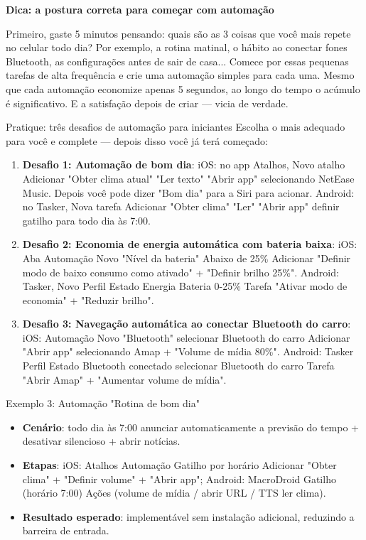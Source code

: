 \textbf{Dica: a postura correta para começar com automação}\par

Primeiro, gaste 5 minutos pensando: quais são as 3 coisas que você mais repete no celular todo dia? Por exemplo, a rotina matinal, o hábito ao conectar fones Bluetooth, as configurações antes de sair de casa... Comece por essas pequenas tarefas de alta frequência e crie uma automação simples para cada uma. Mesmo que cada automação economize apenas 5 segundos, ao longo do tempo o acúmulo é significativo. E a satisfação depois de criar — vicia de verdade.

\begin{tcbpractice}{Pratique: três desafios de automação para iniciantes}
Escolha o mais adequado para você e complete — depois disso você já terá começado:

\begin{enumerate}
  \item \textbf{Desafio 1: Automação de bom dia}: iOS: no app Atalhos, Novo atalho Adicionar "Obter clima atual" "Ler texto" "Abrir app" selecionando NetEase Music. Depois você pode dizer "Bom dia" para a Siri para acionar. Android: no Tasker, Nova tarefa Adicionar "Obter clima" "Ler" "Abrir app" definir gatilho para todo dia às 7:00.
  \item \textbf{Desafio 2: Economia de energia automática com bateria baixa}: iOS: Aba Automação Novo "Nível da bateria" Abaixo de 25\% Adicionar "Definir modo de baixo consumo como ativado" + "Definir brilho 25\%". Android: Tasker, Novo Perfil Estado Energia Bateria 0-25\% Tarefa "Ativar modo de economia" + "Reduzir brilho".
  \item \textbf{Desafio 3: Navegação automática ao conectar Bluetooth do carro}: iOS: Automação Novo "Bluetooth" selecionar Bluetooth do carro Adicionar "Abrir app" selecionando Amap + "Volume de mídia 80\%". Android: Tasker Perfil Estado Bluetooth conectado selecionar Bluetooth do carro Tarefa "Abrir Amap" + "Aumentar volume de mídia".
\end{enumerate}

\end{tcbpractice}

\begin{tcbinfo}{Exemplo 3: Automação "Rotina de bom dia"}
\begin{itemize}
  \item \textbf{Cenário}: todo dia às 7:00 anunciar automaticamente a previsão do tempo + desativar silencioso + abrir notícias.
  \item \textbf{Etapas}: iOS: Atalhos Automação Gatilho por horário Adicionar "Obter clima" + "Definir volume" + "Abrir app"; Android: MacroDroid Gatilho (horário 7:00) Ações (volume de mídia / abrir URL / TTS ler clima).
  \item \textbf{Resultado esperado}: implementável sem instalação adicional, reduzindo a barreira de entrada.
\end{itemize}

\end{tcbinfo}
